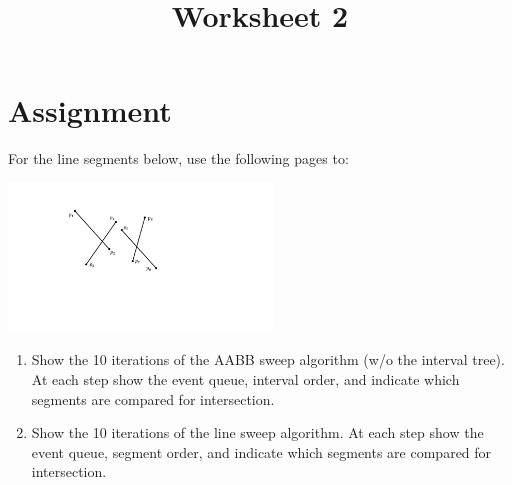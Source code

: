 \documentclass[a4paper,12pt]{article}
\title{Worksheet 2}
\begin{document}
\maketitle

\worksheetGroundRules


\vspace{5pt}
\section{Assignment}

\vspace{10pt}
\hspace{0.5cm} For the line segments below, use the following pages to:

\begin{center}
\includegraphics[width=7cm]{../images/linesweep.pdf}
\end{center}

\begin{enumerate}

\item Show the 10 iterations of the AABB sweep algorithm (w/o the interval tree). At each step show the event queue, interval order, and indicate which segments are compared for intersection.

\item Show the 10 iterations of the line sweep algorithm. At each step show the event queue, segment order, and indicate which segments are compared for intersection.



\end{enumerate}

\worksheetSubmission


\newpage
\end{document}

